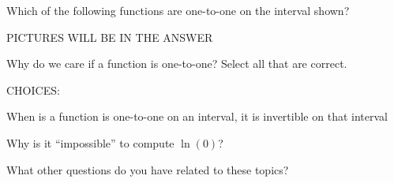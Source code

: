 \documentclass{ximera}
\begin{document}
\begin{question}
\begin{solution}
\begin{multiple-choice}
  \end{multiple-choice}  
\end{solution}
\end{question}

\begin{question}
Which of the following functions are one-to-one on the interval shown?

PICTURES WILL BE IN THE ANSWER

\end{question}

\begin{question}
Why do we care if a function is one-to-one? Select all that are
correct.

CHOICES:

When is a function is one-to-one on an interval, it is invertible on
that interval

\end{question}

\begin{question}
Why is it ``impossible'' to compute $\ln(0)$?
\end{question}

What other questions do you have related to these topics?

\begin{free-response}
\end{free-response}
\end{document}
